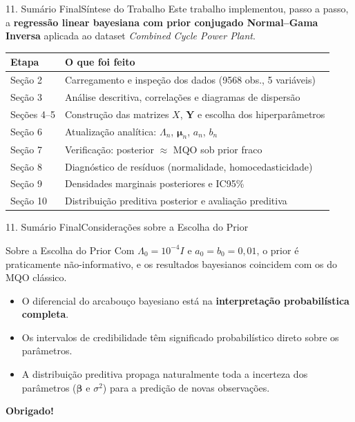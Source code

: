 \documentclass[10pt,aspectratio=169]{beamer}
\begin{document}
\begin{frame}{11. Sumário Final}{Síntese do Trabalho}
    Este trabalho implementou, passo a passo, a \textbf{regressão linear bayesiana com prior conjugado Normal--Gama Inversa} aplicada ao dataset \textit{Combined Cycle Power Plant}.
    \begin{table}
        \centering
        \small
        \begin{tabular}{ll}
            \toprule
            \textbf{Etapa} & \textbf{O que foi feito} \\
            \midrule
            Seção 2 & Carregamento e inspeção dos dados (9568 obs., 5 variáveis) \\
            Seção 3 & Análise descritiva, correlações e diagramas de dispersão \\
            Seções 4--5 & Construção das matrizes $X$, $\mathbf{Y}$ e escolha dos hiperparâmetros \\
            Seção 6 & Atualização analítica: $\Lambda_n$, $\boldsymbol{\mu}_n$, $a_n$, $b_n$ \\
            Seção 7 & Verificação: posterior $\approx$ MQO sob prior fraco \\
            Seção 8 & Diagnóstico de resíduos (normalidade, homocedasticidade) \\
            Seção 9 & Densidades marginais posteriores e IC95\% \\
            Seção 10 & Distribuição preditiva posterior e avaliação preditiva \\
            \bottomrule
        \end{tabular}
    \end{table}
\end{frame}

\begin{frame}{11. Sumário Final}{Considerações sobre a Escolha do Prior}
    \begin{block}{Sobre a Escolha do Prior}
        Com $\Lambda_0 = 10^{-4} I$ e $a_0 = b_0 = 0,01$, o prior é praticamente não-informativo, e os resultados bayesianos coincidem com os do MQO clássico.
    \end{block}
    \vspace{0.3cm}
    \begin{itemize}
        \item O diferencial do arcabouço bayesiano está na \textbf{interpretação probabilística completa}.
        \item Os intervalos de credibilidade têm significado probabilístico direto sobre os parâmetros.
        \item A distribuição preditiva propaga naturalmente toda a incerteza dos parâmetros ($\boldsymbol{\beta}$ e $\sigma^2$) para a predição de novas observações.
    \end{itemize}
    \vspace{0.5cm}
    \begin{center}
        \Large \textbf{Obrigado!}
    \end{center}
\end{frame}
\end{document}
